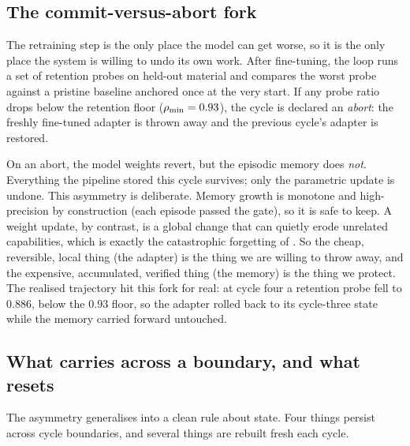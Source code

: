 \subsection*{The commit-versus-abort fork}

The retraining step is the only place the model can get worse, so it is the only
place the system is willing to undo its own work. After fine-tuning, the loop
runs a set of retention probes on held-out material and compares the worst probe
against a pristine baseline anchored once at the very start. If any probe ratio
drops below the retention floor ($\rho_{\min} = 0.93$), the cycle is declared an
\emph{abort}: the freshly fine-tuned adapter is thrown away and the previous
cycle's adapter is restored.

\begin{precise}
On an abort, the model weights revert, but the episodic memory does \emph{not}.
Everything the pipeline stored this cycle survives; only the parametric update is
undone. This asymmetry is deliberate. Memory growth is monotone and
high-precision by construction (each episode passed the gate), so it is safe to
keep. A weight update, by contrast, is a global change that can quietly erode
unrelated capabilities, which is exactly the catastrophic forgetting of
. So the cheap, reversible, local thing (the adapter) is the
thing we are willing to throw away, and the expensive, accumulated, verified
thing (the memory) is the thing we protect. The realised trajectory hit this fork
for real: at cycle four a retention probe fell to $0.886$, below the $0.93$ floor,
so the adapter rolled back to its cycle-three state while the memory carried
forward untouched.
\end{precise}

\subsection*{What carries across a boundary, and what resets}

The asymmetry generalises into a clean rule about state. Four things persist
across cycle boundaries, and several things are rebuilt fresh each cycle.

